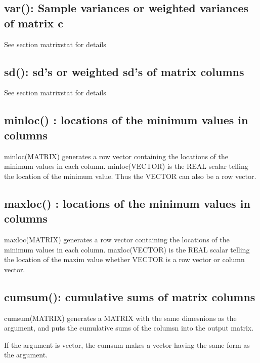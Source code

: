 \subsection{\textcolor{VioletRed}{var}(): Sample variances or weighted variances of matrix c}
\label{var}
See section matrixstat for details
\subsection{\textcolor{VioletRed}{sd}(): sd's or weighted sd's of matrix columns}
\label{sd}
See section matrixstat for details
\subsection{\textcolor{VioletRed}{minloc}() : locations of the minimum values in columns}
\label{minloc}
\textcolor{VioletRed}{minloc}(MATRIX) generates a row vector containing the locations of the  minimum
values in each column. \textcolor{VioletRed}{minloc}(VECTOR) is the REAL scalar telling
the location of the minimum value. Thus the VECTOR can also be a row vector.
\subsection{\textcolor{VioletRed}{maxloc}() : locations of the minimum values in columns}
\label{maxloc}
\textcolor{VioletRed}{maxloc}(MATRIX) generates a row vector containing the locations of the  minimum
values in each column. \textcolor{VioletRed}{maxloc}(VECTOR) is the REAL scalar telling
the location of the maxim value whether VECTOR is a row vector or column vector.
\subsection{\textcolor{VioletRed}{cumsum}(): cumulative sums of matrix columns}
\label{cumsum}
\textcolor{VioletRed}{cumsum}(MATRIX) generates a MATRIX with the same dimesnions as the argument,
and puts the cumulative sums of the columsn into the output matrix.
\begin{note}
If the argument is vector, the cumsum makes a vector having the same
form as the argument.
\end{note}












